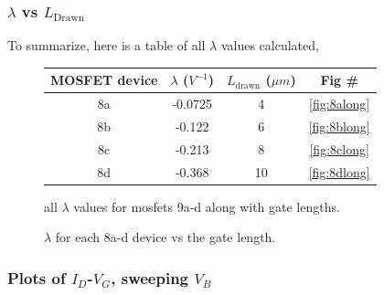 \documentclass{article}
\begin{document}
\subsubsection{$\lambda$ vs $L_{\text{Drawn}}$}
To summarize, here is a table of all $\lambda$ values calculated,
\begin{figure}[H]
\centering
\begin{tabular}{c || c | c | c }
MOSFET device & $\lambda$ ($V^{-1}$) & $L_{\text{drawn}}$ ($\mu m$) & Fig \# \\ \hline
8a & -0.0725 & 4 & \textcolor{blue}{\ref{fig:8along}} \\ \hline
8b & -0.122 & 6 & \textcolor{blue}{\ref{fig:8blong}}\\ \hline
8c & -0.213 & 8 & \textcolor{blue}{\ref{fig:8clong}}\\ \hline
8d & -0.368 & 10 & \textcolor{blue}{\ref{fig:8dlong}}\\ \hline
\end{tabular}
\caption{all $\lambda$ values for mosfets 9a-d along with gate lengths.}
\end{figure}

\begin{figure}[H]
\centering
{}
\caption{$\lambda$ for each 8a-d device vs the gate length.}
\end{figure}


\subsubsection{Plots of $I_D$-$V_G$, sweeping $V_B$}
\end{document}
